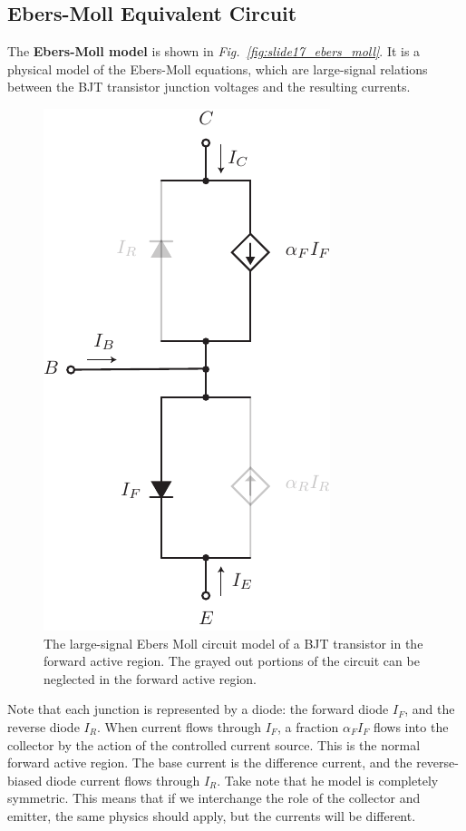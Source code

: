 \subsection{Ebers-Moll Equivalent Circuit}
The \textbf{Ebers-Moll model} is shown in \emph{Fig.~\ref{fig:slide17_ebers_moll}}.  It is a physical model of the Ebers-Moll equations, which are large-signal relations between the BJT transistor junction voltages and the resulting currents.
\newpage
\begin{figure}[t]
\centering
\includegraphics[scale=1]{slide18_ebers_moll_approx}
\caption{The large-signal Ebers Moll circuit model of a BJT transistor in the forward active region.  The grayed out portions of the circuit can be neglected in the forward active region.} \label{fig:slide18_ebers_moll_approx}
\end{figure}
Note that each junction is represented by a diode: the forward diode $I_F$, and the reverse diode $I_R$.  When current flows through $I_F$, a fraction $\alpha_F I_F$ flows into the collector by the action of the controlled current source.  This is the normal forward active region. The base current is the difference current, and the reverse-biased diode current flows through $I_R$.  Take note that he model is completely symmetric.  This means that if we interchange the role of the collector and emitter, the same physics should apply, but the currents will be different.  
